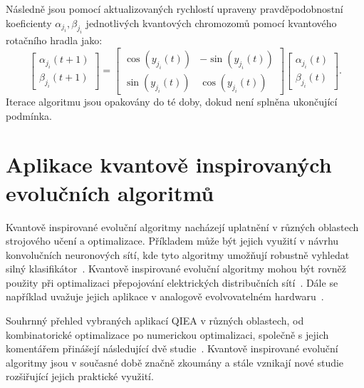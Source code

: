 Následně jsou pomocí aktualizovaných rychlostí upraveny pravděpodobnostní koeficienty $\alpha_{j_i}, \beta_{j_i}$ jednotlivých kvantových chromozomů pomocí kvantového rotačního hradla jako: 
\begin{equation*}
    \begin{bmatrix}
        \alpha_{j_i}\left(t+1\right) \\
        \beta_{j_i}\left(t+1\right)
    \end{bmatrix}
    =
    \begin{bmatrix}
        \cos{\left( y_{j_i}\left(t\right) \right)} & - \sin{\left( y_{j_i}\left(t\right) \right)} \\
        \sin{\left( y_{j_i}\left(t\right) \right)} &   \cos{\left( y_{j_i}\left(t\right) \right)}
    \end{bmatrix}
    \begin{bmatrix}
        \alpha_{j_i}\left(t\right) \\
        \beta_{j_i}\left(t\right) 
    \end{bmatrix}.
\end{equation*}
Iterace algoritmu jsou opakovány do té doby, dokud není splněna ukončující podmínka. 

\section{Aplikace kvantově inspirovaných evolučních algoritmů}
Kvantově inspirované evoluční algoritmy nacházejí uplatnění v různých oblastech strojového učení a optimalizace. 
Příkladem může být jejich využití v návrhu konvolučních neuronových sítí, kde tyto algoritmy umožňují robustně vyhledat silný klasifikátor~\cite{QIEA-CNN}. 
Kvantově inspirované evoluční algoritmy mohou být rovněž použity při optimalizaci přepojování elektrických distribučních sítí~\cite{QIEA-net}. 
Dále se například uvažuje jejich aplikace v analogově evolvovatelném hardwaru~\cite{QIEA-EHW}. 

Souhrnný přehled vybraných aplikací QIEA v různých oblastech, od kombinatorické optimalizace po numerickou optimalizaci, společně s jejich komentářem přinášejí následující dvě studie~\cite{QIEA-survey1, QIEA-survey2}. 
Kvantově inspirované evoluční algoritmy jsou v současné době značně zkoumány a stále vznikají nové studie rozšiřující jejich praktické využití. 
